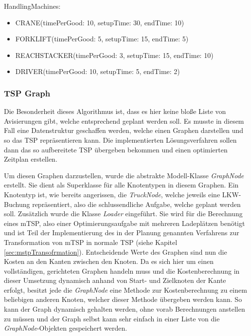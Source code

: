 HandlingMachines:
\begin{itemize}
    \item CRANE(timePerGood: 10, setupTime: 30, endTime: 10)
    \item FORKLIFT(timePerGood: 5, setupTime: 15, endTime: 5)
    \item REACHSTACKER(timePerGood: 3, setupTime: 15, endTime: 10)
    \item DRIVER(timePerGood: 10, setupTime: 5, endTime: 2)
\end{itemize}



\subsubsection{TSP Graph}

Die Besonderheit dieses Algorithmus ist, dass es hier keine bloße Liste von Avisierungen gibt, welche entsprechend geplant werden soll. Es musste in diesem Fall eine Datenstruktur geschaffen werden, welche einen Graphen darstellen und so das TSP repräsentieren kann. Die implementierten Lösungsverfahren sollen dann das so aufbereitete TSP übergeben bekommen und einen optimierten Zeitplan erstellen.

Um diesen Graphen darzustellen, wurde die abstrakte Modell-Klasse \textit{GraphNode} erstellt. Sie dient als Superklasse für alle Knotentypen in diesem Graphen. Ein Knotentyp ist, wie bereits angerissen, die \textit{TruckNode}, welche jeweils eine LKW-Buchung repräsentiert, also die schlussendliche Aufgabe, welche geplant werden soll. Zusätzlich wurde die Klasse \textit{Loader} eingeführt. Sie wird für die Berechnung eines mTSP, also einer Optimierungsaufgabe mit mehreren Ladeplätzen benötigt und ist Teil der Implementierung des in der Planung genannten Verfahrens zur Transformation von mTSP in normale TSP (siehe Kapitel \ref{sec:mstpTransofrmation}). Entscheidende Werte des Graphen sind nun die Kosten an den Kanten zwischen den Knoten. Da es sich hier um einen vollständigen, gerichteten Graphen handeln muss und die Kostenberechnung in dieser Umsetzung dynamisch anhand von Start- und Zielknoten der Kante erfolgt, besitzt jede die \textit{GraphNode} eine Methode zur Kostenberechnung zu einem beliebigen anderen Knoten, welcher dieser Methode übergeben werden kann. So kann der Graph dynamisch gehalten werden, ohne vorab Berechnungen anstellen zu müssen und der Graph selbst kann sehr einfach in einer Liste von die \textit{GraphNode}-Objekten gespeichert werden.

